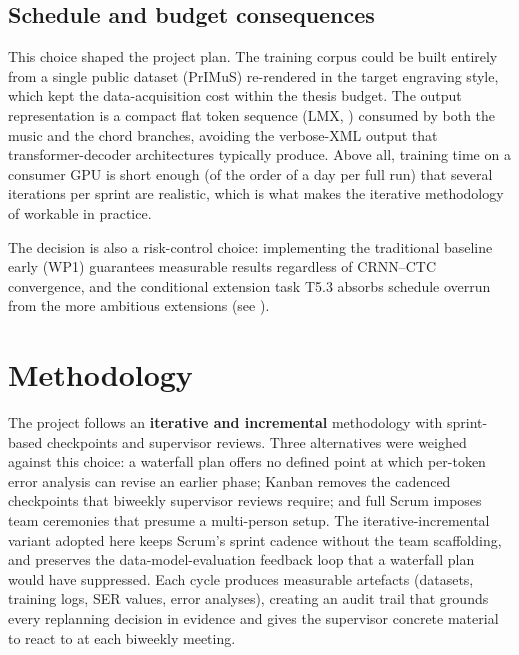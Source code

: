 \subsection{Schedule and budget consequences}

This choice shaped the project plan.
The training corpus could be built entirely from a single
public dataset (PrIMuS) re-rendered in the target engraving style,
which kept the data-acquisition cost within the thesis budget.
The output representation is a compact flat token
sequence (LMX, ) consumed by both the
music and the chord branches, avoiding the verbose-XML output that
transformer-decoder architectures typically produce.
Above all, training time on a consumer GPU is short enough
(of the order of a day per full run) that several iterations per
sprint are realistic, which is what makes the iterative methodology
of  workable in practice.

The decision is also a risk-control choice: implementing the
traditional baseline early (WP1) guarantees measurable results
regardless of CRNN--CTC convergence, and the conditional
extension task T5.3 absorbs schedule overrun from the more
ambitious extensions (see ).

\section{Methodology}
\label{sec:mgmt-methodology}

The project follows an \textbf{iterative and incremental}
methodology with sprint-based checkpoints and supervisor reviews.
Three alternatives were weighed against this choice: a waterfall
plan offers no defined point at which per-token error analysis
can revise an earlier phase; Kanban removes the cadenced
checkpoints that biweekly supervisor reviews require; and full
Scrum imposes team ceremonies that presume a multi-person setup.
The iterative-incremental variant adopted here keeps Scrum's
sprint cadence without the team scaffolding, and preserves the
data-model-evaluation feedback loop that a waterfall plan would
have suppressed.
Each cycle produces measurable artefacts (datasets, training
logs, SER values, error analyses), creating an audit trail that
grounds every replanning decision in evidence and gives the
supervisor concrete material to react to at each biweekly
meeting.

